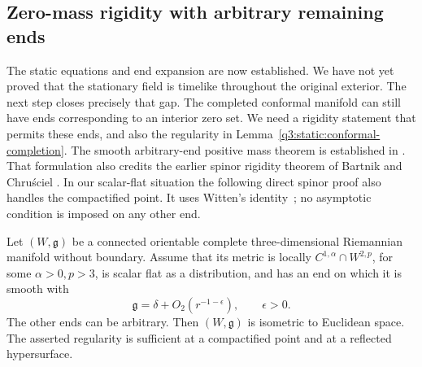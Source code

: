 \subsection{Zero-mass rigidity with arbitrary remaining ends}
\label{q3:static:spin-subsection}

The static equations and end expansion are now established.  We have
not yet proved that the stationary field is timelike throughout the
original exterior.  The next step closes precisely that gap.
The completed conformal manifold can still have ends corresponding
to an interior zero set. We need a rigidity statement that permits
these ends, and also the regularity in
Lemma~\ref{q3:static:conformal-completion}.
The smooth arbitrary-end positive mass theorem is established in
\cite[Theorem B]{CecchiniZeidler2024}.
That formulation also credits the earlier spinor rigidity theorem of
Bartnik and Chru\'sciel \cite[Theorem~11.2]{BartnikChrusciel2005}.
In our scalar-flat situation the following direct spinor proof also
handles the compactified point. It uses Witten's
identity~\cite{Witten1981}; no asymptotic condition is imposed on any
other end.

\begin{lemma}
\label{q3:static:spin-rigidity}
Let \((W,\mathfrak g)\) be a connected orientable complete
three-dimensional Riemannian manifold without boundary.
Assume that its metric is locally \(C^{1,\alpha}\cap W^{2,p}\),
for some \(\alpha>0,p>3\), is scalar flat as a distribution,
and has an end on which it is smooth with
\[
\mathfrak g=\delta+O_2(r^{-1-\epsilon}),\qquad \epsilon>0.
\]
The other ends can be arbitrary.
Then \((W,\mathfrak g)\) is isometric to Euclidean space.
The asserted regularity is sufficient at a compactified point and
at a reflected hypersurface.
\end{lemma}

